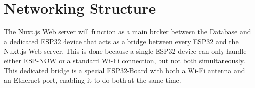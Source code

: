 \section{Networking Structure}
The Nuxt.js Web server will function as a main broker between
the Database and a dedicated ESP32 device that  acts
as a bridge between every ESP32 and the Nuxt.js Web server.
This is done because a single ESP32 device can only handle
either ESP-NOW or a standard Wi-Fi connection, but not both
simultaneously. This dedicated bridge is a special 
ESP32-Board with both a Wi-Fi antenna and an Ethernet port,
enabling it to do both at the same time. 

    